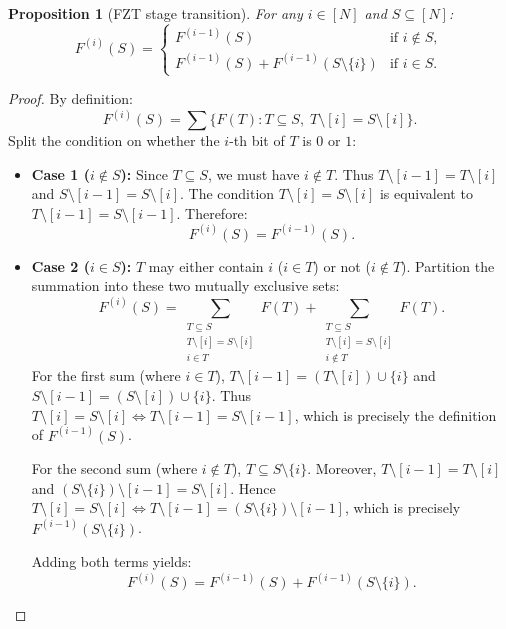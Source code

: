 \documentclass[11pt, letterpaper]{article}
\newtheorem{proposition}{Proposition}[section]
\begin{document}
\begin{proposition}[FZT stage transition]
For any $i \in [N]$ and $S \subseteq [N]$:
\begin{equation}
    F^{(i)}(S) = \begin{cases}
        F^{(i-1)}(S) & \text{if } i \notin S, \\
        F^{(i-1)}(S) + F^{(i-1)}(S \setminus \{i\}) & \text{if } i \in S.
    \end{cases}
\end{equation}
\end{proposition}

\begin{proof}
By definition:
\begin{equation}
    F^{(i)}(S) = \sum \{F(T) : T \subseteq S, \; T \setminus [i] = S \setminus [i]\}.
\end{equation}
Split the condition on whether the $i$-th bit of $T$ is $0$ or $1$:
\begin{itemize}
    \item \textbf{Case 1 ($i \notin S$):} Since $T \subseteq S$, we must have $i \notin T$. Thus $T \setminus [i-1] = T \setminus [i]$ and $S \setminus [i-1] = S \setminus [i]$. The condition $T \setminus [i] = S \setminus [i]$ is equivalent to $T \setminus [i-1] = S \setminus [i-1]$. Therefore:
    \begin{equation}
        F^{(i)}(S) = F^{(i-1)}(S).
    \end{equation}
    \item \textbf{Case 2 ($i \in S$):} $T$ may either contain $i$ ($i \in T$) or not ($i \notin T$).
    Partition the summation into these two mutually exclusive sets:
    \begin{equation}
        F^{(i)}(S) = \sum_{\substack{T \subseteq S \\ T \setminus [i] = S \setminus [i] \\ i \in T}} F(T) + \sum_{\substack{T \subseteq S \\ T \setminus [i] = S \setminus [i] \\ i \notin T}} F(T).
    \end{equation}
    For the first sum (where $i \in T$), $T \setminus [i-1] = (T \setminus [i]) \cup \{i\}$ and $S \setminus [i-1] = (S \setminus [i]) \cup \{i\}$. Thus $T \setminus [i] = S \setminus [i] \iff T \setminus [i-1] = S \setminus [i-1]$, which is precisely the definition of $F^{(i-1)}(S)$.
    
    For the second sum (where $i \notin T$), $T \subseteq S \setminus \{i\}$. Moreover, $T \setminus [i-1] = T \setminus [i]$ and $(S \setminus \{i\}) \setminus [i-1] = S \setminus [i]$. Hence $T \setminus [i] = S \setminus [i] \iff T \setminus [i-1] = (S \setminus \{i\}) \setminus [i-1]$, which is precisely $F^{(i-1)}(S \setminus \{i\})$.
    
    Adding both terms yields:
    \begin{equation}
        F^{(i)}(S) = F^{(i-1)}(S) + F^{(i-1)}(S \setminus \{i\}).
    \end{equation}
\end{itemize}
\end{proof}
\end{document}
